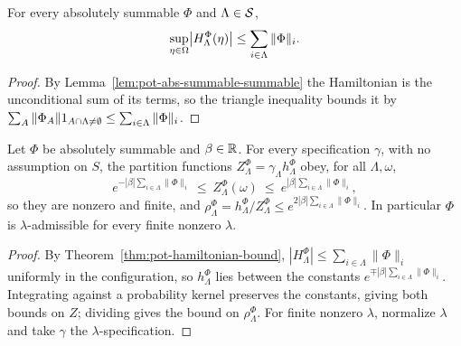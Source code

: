\begin{theorem}[Georgii (2.14)]
    \label{thm:pot-hamiltonian-bound}
    \leanok

    For every absolutely summable $\Phi$ and $\Lambda \in \mathcal{S}$,
    \[ \sup_{\eta \in \Omega} \bigl|H^\Phi_\Lambda(\eta)\bigr|
       \leq \sum_{i \in \Lambda} \|\Phi\|_i . \]
\end{theorem}
\begin{proof}
    \leanok

    By Lemma~\ref{lem:pot-abs-summable-summable} the Hamiltonian is the unconditional sum of
    its terms, so the triangle inequality bounds it by
    $\sum_A \|\Phi_A\| 1_{A \cap \Lambda \neq \emptyset} \leq \sum_{i \in \Lambda}
    \|\Phi\|_i$.
\end{proof}

\begin{corollary}
    \label{cor:pot-admissible}
    \leanok

    Let $\Phi$ be absolutely summable and $\beta \in \mathbb{R}$. For every specification $\gamma$,
    with no assumption on $S$, the partition functions $Z^\Phi_\Lambda = \gamma_\Lambda
    h^\Phi_\Lambda$ obey, for all $\Lambda, \omega$,
    \[ e^{-|\beta| \sum_{i \in \Lambda}\|\Phi\|_i} \ \leq\ Z^\Phi_\Lambda(\omega)\ \leq\
       e^{|\beta| \sum_{i \in \Lambda}\|\Phi\|_i} , \]
    so they are nonzero and finite, and $\rho^\Phi_\Lambda = h^\Phi_\Lambda / Z^\Phi_\Lambda
    \leq e^{2|\beta| \sum_{i \in \Lambda}\|\Phi\|_i}$. In particular $\Phi$ is
    $\lambda$-admissible for every finite nonzero $\lambda$.
\end{corollary}
\begin{proof}
    \leanok

    By Theorem~\ref{thm:pot-hamiltonian-bound}, $|H^\Phi_\Lambda| \leq \sum_{i \in \Lambda}
    \|\Phi\|_i$ uniformly in the configuration, so $h^\Phi_\Lambda$ lies between the constants
    $e^{\mp |\beta| \sum_{i \in \Lambda}\|\Phi\|_i}$. Integrating against a probability kernel
    preserves the constants, giving both bounds on $Z$; dividing gives the bound on
    $\rho^\Phi_\Lambda$. For finite nonzero $\lambda$, normalize $\lambda$ and take $\gamma$
    the $\lambda$-specification.
\end{proof}


